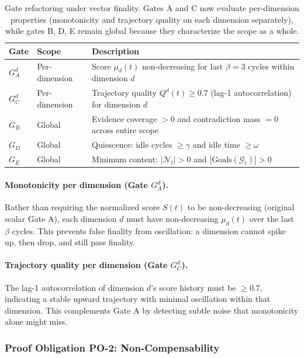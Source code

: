 \documentclass[11pt]{article}
\begin{document}
\begin{table}[H]
\centering
\small
\begin{tabular}{llp{6cm}}
\toprule
\textbf{Gate} & \textbf{Scope} & \textbf{Description} \\
\midrule
$G_A^d$ & Per-dimension & Score $\mu_d(t)$ non-decreasing for last $\beta = 3$ cycles within dimension $d$ \\
$G_C^d$ & Per-dimension & Trajectory quality $Q^d(t) \geq 0.7$ (lag-1 autocorrelation) for dimension $d$ \\
$G_B$ & Global & Evidence coverage $> 0$ and contradiction mass $= 0$ across entire scope \\
$G_D$ & Global & Quiescence: idle cycles $\geq \gamma$ and idle time $\geq \omega$ \\
$G_E$ & Global & Minimum content: $|\mathcal{N}_t| > 0$ and $|\text{Goals}(\mathcal{G}_t)| > 0$ \\
\bottomrule
\end{tabular}
\caption{Gate refactoring under vector finality. Gates A and C now evaluate per-dimension
properties (monotonicity and trajectory quality on each dimension separately), while gates B, D, E
remain global because they characterize the scope as a whole.}
\label{tab:gate-refactoring}
\end{table}

\paragraph{Monotonicity per dimension (Gate $G_A^d$).}
Rather than requiring the normalized score $S(t)$ to be non-decreasing (original scalar Gate A),
each dimension $d$ must have non-decreasing $\mu_d(t)$ over the last $\beta$ cycles. This prevents
false finality from oscillation: a dimension cannot spike up, then drop, and still pass finality.

\paragraph{Trajectory quality per dimension (Gate $G_C^d$).}
The lag-1 autocorrelation of dimension $d$'s score history must be $\geq 0.7$, indicating a stable
upward trajectory with minimal oscillation within that dimension. This complements Gate A by detecting
subtle noise that monotonicity alone might miss.

\subsubsection{Proof Obligation PO-2: Non-Compensability}
\end{document}
